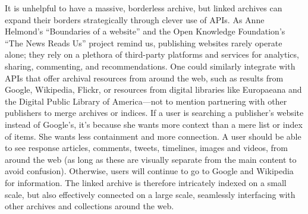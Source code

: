 It is unhelpful to have a massive, borderless archive, but linked archives can expand their borders strategically through clever use of APIs. As Anne Helmond's ``Boundaries of a website'' and the Open Knowledge Foundation's ``The News Reads Us'' project remind us, publishing websites rarely operate alone; they rely on a plethora of third-party platforms and services for analytics, sharing, commenting, and recommendations.\autocite{helmond_exploring_2013,wehrmeyer_news_????} One could similarly integrate with APIs that offer archival resources from around the web, such as results from Google, Wikipedia, Flickr, or resources from digital libraries like Europaeana and the Digital Public Library of America---not to mention partnering with other publishers to merge archives or indices. If a user is searching a publisher's website instead of Google's, it's because she wants more context than a mere list or index of items. She wants less containment and more connection. A user should be able to see response articles, comments, tweets, timelines, images and videos, from around the web (as long as these are visually separate from the main content to avoid confusion). Otherwise, users will continue to go to Google and Wikipedia for information. The linked archive is therefore intricately indexed on a small scale, but also effectively connected on a large scale, seamlessly interfacing with other archives and collections around the web.





